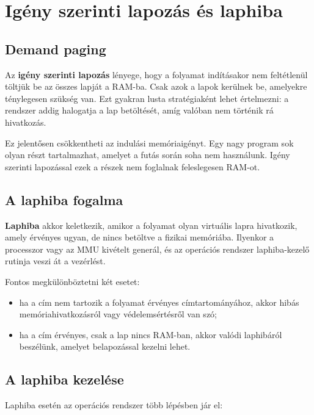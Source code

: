 \section{Igény szerinti lapozás és laphiba}

\subsection{Demand paging}

Az \textbf{igény szerinti lapozás} lényege, hogy a folyamat indításakor nem feltétlenül töltjük be az összes lapját a RAM-ba. Csak azok a lapok kerülnek be, amelyekre ténylegesen szükség van. Ezt gyakran lusta stratégiaként lehet értelmezni: a rendszer addig halogatja a lap betöltését, amíg valóban nem történik rá hivatkozás.

Ez jelentősen csökkentheti az indulási memóriaigényt. Egy nagy program sok olyan részt tartalmazhat, amelyet a futás során soha nem használunk. Igény szerinti lapozással ezek a részek nem foglalnak feleslegesen RAM-ot.

\subsection{A laphiba fogalma}

\textbf{Laphiba} akkor keletkezik, amikor a folyamat olyan virtuális lapra hivatkozik, amely érvényes ugyan, de nincs betöltve a fizikai memóriába. Ilyenkor a processzor vagy az MMU kivételt generál, és az operációs rendszer laphiba-kezelő rutinja veszi át a vezérlést.

Fontos megkülönböztetni két esetet:

\begin{itemize}
  \item ha a cím nem tartozik a folyamat érvényes címtartományához, akkor hibás memóriahivatkozásról vagy védelemsértésről van szó;
  \item ha a cím érvényes, csak a lap nincs RAM-ban, akkor valódi laphibáról beszélünk, amelyet belapozással kezelni lehet.
\end{itemize}



\subsection{A laphiba kezelése}

Laphiba esetén az operációs rendszer több lépésben jár el:

